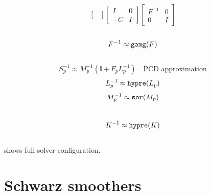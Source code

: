 \documentclass[presentation,aspectratio=43]{beamer}
\begin{document}
\begin{frame}[fragile,t]
\begin{columns}[t]
\begin{column}{0.49\textwidth}
{\begin{equation*}
\begin{bmatrix}
          \end{bmatrix}
          \begin{bmatrix}
            I & 0\\
            -C & I
          \end{bmatrix}
          \begin{bmatrix}
            F^{-1} & 0 \\
            0 & I
          \end{bmatrix}
        \end{equation*}
        \\[0.5\baselineskip]
        \begin{equation*}
          F^{-1} \approx \text{\texttt{gamg}}(F)
        \end{equation*}
        \\[1.25\baselineskip]
        \begin{equation*}
          S_p^{-1} \approx M_p^{-1}(\mathbb{I} + F_p L_p^{-1})\quad\text{PCD approximation}
        \end{equation*}
        \vspace{-1\baselineskip}
        \begin{equation*}
          L_p^{-1} \approx \text{\texttt{hypre}}(L_p)
        \end{equation*}
        \vspace{-1\baselineskip}
        \begin{equation*}
          M_p^{-1} \approx \text{\texttt{sor}}(M_p)
        \end{equation*}
        \\[0.4\baselineskip]
        \begin{equation*}
          K^{-1} \approx \text{\texttt{hypre}}(K)
        \end{equation*}
      }
    \end{column}
  \end{columns}
  \vspace{-\baselineskip}
  {\scriptsize \textcite[\S B.4]{Kirby:2018} shows full solver configuration.}
\end{frame}

\section{Schwarz smoothers}
\end{document}
